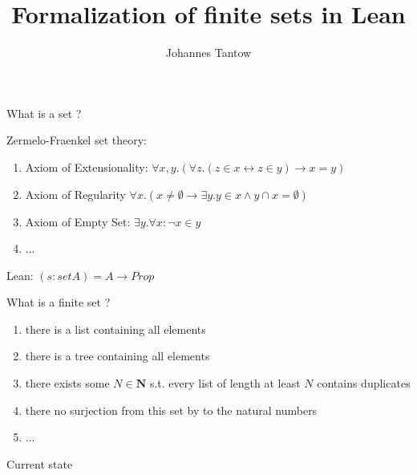 \documentclass{beamer}
\title[Finite sets]{Formalization of finite sets in Lean}
\author[J. Tantow]{Johannes Tantow}
\begin{document}
    \maketitle

    \begin{frame}{What is a set ?}

        Zermelo-Fraenkel set theory:
        \begin{enumerate}
            \item Axiom of Extensionality:
            $\forall x, y.(\forall z. (z \in x \leftrightarrow z \in y) \rightarrow x=y)$
            
            \item Axiom of Regularity 
            $\forall x. (x \neq \emptyset \rightarrow \exists y. y \in x \land y \cap x = \emptyset ) $
            
            \item Axiom of Empty Set: $\exists y. \forall x: \neg x \in y$
            \item ...
            
            \end{enumerate}
        \pause
        Lean:
        $(s: set A) = A \to Prop$
    \end{frame}
    \begin{frame}{What is a finite set ?}
        \begin{enumerate}
            \item there is a list containing all elements
            \item there is a tree containing all elements
            \item there exists some $N \in \mathbf{N}$ s.t. every list of length at least $N$ contains duplicates
            \item there no surjection from this set by to the natural numbers
            \item ...
        \end{enumerate}
    \end{frame}

    \begin{frame}{Current state}
        
    \end{frame}
\end{document}
